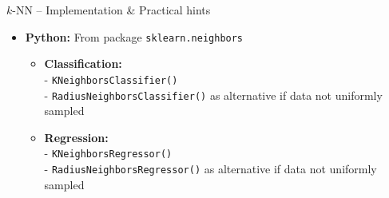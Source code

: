 \documentclass[11pt,compress,t,notes=noshow, xcolor=table]{beamer}
\begin{document}
\begin{frame2}{$k$-NN -- Implementation \& Practical hints}
\begin{itemize}
  \item \textbf{Python:} From package \texttt{sklearn.neighbors} 
  \begin{itemize}
    \item \textbf{Classification:}\\ 
    - \texttt{KNeighborsClassifier()}\\
    - \texttt{RadiusNeighborsClassifier()} as alternative if data not uniformly sampled
    \item \textbf{Regression:}\\
    - \texttt{KNeighborsRegressor()} \\
    - \texttt{RadiusNeighborsRegressor()} as alternative if data not uniformly sampled
  \end{itemize}
\end{itemize}
  
\end{frame2}
\end{document}
